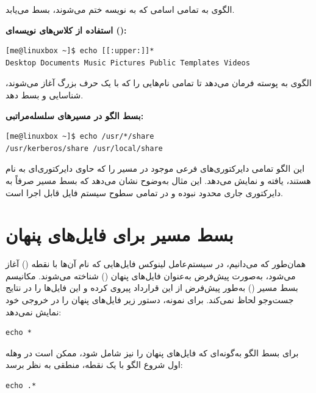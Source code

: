 الگوی  به تمامی اسامی که به نویسه  ختم می‌شوند، بسط می‌یابد.

\textbf{استفاده از کلاس‌های نویسه‌ای ():}

\begin{latin}
\begin{lstlisting}
[me@linuxbox ~]$ echo [[:upper:]]*
Desktop Documents Music Pictures Public Templates Videos
\end{lstlisting}
\end{latin}

الگوی \cmd{[[:upper:]]*} به پوسته فرمان می‌دهد تا تمامی نام‌هایی را که با یک حرف بزرگ آغاز می‌شوند، شناسایی و بسط دهد.

\textbf{بسط الگو در مسیرهای سلسله‌مراتبی:}

\begin{latin}
\begin{lstlisting}
[me@linuxbox ~]$ echo /usr/*/share
/usr/kerberos/share /usr/local/share
\end{lstlisting}
\end{latin}

این الگو تمامی دایرکتوری‌های فرعی موجود در مسیر  را که حاوی دایرکتوری‌ای به نام  هستند، یافته و نمایش می‌دهد. این مثال به‌وضوح نشان می‌دهد که بسط مسیر صرفاً به دایرکتوری جاری محدود نبوده و در تمامی سطوح سیستم فایل قابل اجرا است.

\section{بسط مسیر برای فایل‌های پنهان}

همان‌طور که می‌دانیم، در سیستم‌عامل لینوکس فایل‌هایی که نام آن‌ها با نقطه () آغاز می‌شود، به‌صورت پیش‌فرض به‌عنوان فایل‌های پنهان () شناخته می‌شوند. مکانیسم بسط مسیر () به‌طور پیش‌فرض از این قرارداد پیروی کرده و این فایل‌ها را در نتایج جست‌وجو لحاظ نمی‌کند. برای نمونه، دستور زیر فایل‌های پنهان را در خروجی خود نمایش نمی‌دهد:

\begin{latin}
\begin{lstlisting}
echo *
\end{lstlisting}
\end{latin}

برای بسط الگو به‌گونه‌ای که فایل‌های پنهان را نیز شامل شود، ممکن است در وهله اول شروع الگو با یک نقطه، منطقی به نظر برسد:

\begin{latin}
\begin{lstlisting}
echo .*
\end{lstlisting}
\end{latin}

